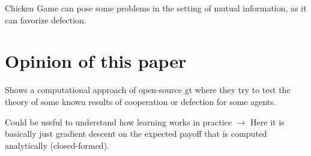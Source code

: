\documentclass{article}
\begin{document}
Chicken Game can pose some problems in the setting of mutual information, as it can favorize defection.

\section{Opinion of this paper}
Shows a computational approach of open-source gt where they try to test the theory of some known results of cooperation or defection for some agents.

Could be useful to understand how learning works in practice $\to$ Here it is basically just gradient descent on the expected payoff that is computed analytically (closed-formed).

\printbibliography
\end{document}
